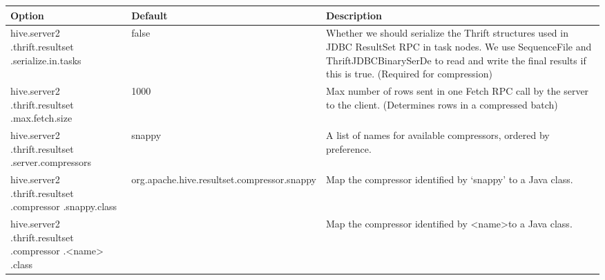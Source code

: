\documentclass[11pt,a4paper]{article}
\begin{document}
		\begin{table}[H]
			\begin{tabular}{| p{3.3cm} | p{1.8cm} | p{6.1cm} |} \hline
				
				\textbf{Option} & \textbf{Default} & \textbf{Description} \\ \hline
				
				hive.server2\linebreak
				.thrift.resultset\linebreak
				.serialize.in.tasks
				& false
				& Whether we should serialize the Thrift structures used in JDBC ResultSet RPC in task nodes.\linebreak
				We use SequenceFile and ThriftJDBCBinarySerDe to read and write the final results if this is true.\linebreak
				(Required for compression)
				\\ \hline
				
				hive.server2\linebreak
				.thrift.resultset\linebreak
				.max.fetch.size
				& 1000
				& Max number of rows sent in one Fetch RPC call by the server to the client.
				(Determines rows in a compressed batch)
				\\ \hline
				
				hive.server2\linebreak
				.thrift.resultset\linebreak
				.server.compressors
				& snappy
				& A list of names for available compressors, ordered by preference.
				\\ \hline
				
				hive.server2\linebreak
				.thrift.resultset\linebreak
				.compressor\linebreak
				.snappy.class
				& org.apache\linebreak.hive\linebreak.resultset\linebreak.compressor\linebreak.snappy
				& Map the compressor identified by `snappy' to a Java class.
				\\ \hline
				
				hive.server2\linebreak
				.thrift.resultset\linebreak
				.compressor\linebreak
				.\textless name\textgreater
				.class
				&
				& Map the compressor identified by \textless name\textgreater\space to a Java class.
				\\ \hline
				

\end{tabular}
\end{table}
\end{document}
